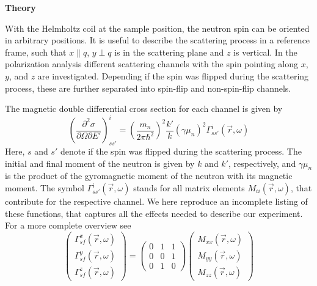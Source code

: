 \vspace{10 pt}
\noindent
{\bf Theory}

\noindent
%
With the Helmholtz coil at the sample position, the neutron spin can be
oriented in arbitrary positions. It is useful to describe the scattering
process in a reference frame, such that $x\parallel q$, $y\perp q$ is in the
scattering plane and $z$ is vertical.
%
In the polarization analysis different scattering channels with the spin
pointing along $x$, $y$, and $z$ are investigated. Depending if the spin was flipped
during the scattering process, these are further separated
into spin-flip and non-spin-flip channels.

\noindent
The magnetic double differential cross section for each channel is given by
\cite{schaerpf}
%
\begin{equation}
  \left(\frac{\partial^2\sigma}{\partial \Omega \partial E'}\right)_{ss'}^{i}
  = \left( \frac{m_n}{2\pi\hbar^2}\right)^2 \frac{k'}{k} (\gamma \mu_n)^2
    \Gamma_{ss'}^{i}(\vec{r},\omega)
\end{equation}
%
Here, $s$ and $s'$
denote if the spin was flipped during the scattering process. The initial and
final moment of the neutron is given by $k$ and $k'$, respectively, and $\gamma
\mu_n$ is the product of the gyromagnetic moment of the neutron with its
magnetic moment. The symbol $\Gamma_{ss'}^{i}(\vec{r},\omega)$ stands for all
matrix elements $M_{ii}(\vec{r},\omega)$, that contribute for the respective
channel. We here reproduce an incomplete listing of these functions, that
captures all the effects needed to describe our experiment. For a more complete
overview see \cite{schaerpf}
%
\begin{equation}
  \begin{pmatrix}
    \Gamma_{sf}^x (\vec{r},\omega)\\
    \Gamma_{sf}^y (\vec{r},\omega)\\
    \Gamma_{sf}^ z (\vec{r},\omega)
  \end{pmatrix}
  =
  \begin{pmatrix}
    0 & 1 & 1 \\
    0 & 0 & 1 \\ 
    0 & 1 & 0 
  \end{pmatrix}
  \begin{pmatrix}
    M_{xx}(\vec{r},\omega) \\
    M_{yy}(\vec{r},\omega) \\
    M_{zz}(\vec{r},\omega)
  \end{pmatrix}
\end{equation}
